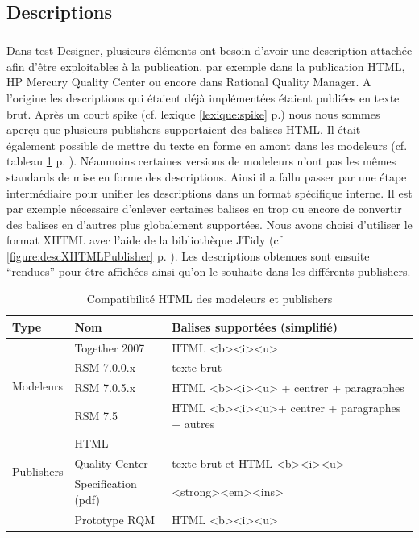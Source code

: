 \subsection{Descriptions}
\subparagraph*{}
Dans test Designer, plusieurs éléments ont besoin d'avoir une description attachée afin d'être exploitables à la publication, par exemple dans la publication HTML, HP Mercury Quality Center ou encore dans Rational Quality Manager. A l'origine les descriptions qui étaient déjà implémentées étaient publiées en texte brut. Après un court spike (cf. lexique \ref{lexique:spike} p.\pageref{lexique:spike}) nous nous sommes aperçu que plusieurs publishers supportaient des balises HTML. Il était également possible de mettre du texte en forme en amont dans les modeleurs (cf. tableau \ref{tableau:compatDescHTML} p. \pageref{tableau:compatDescHTML}). Néanmoins certaines versions de modeleurs n'ont pas les mêmes standards de mise en forme des descriptions. Ainsi il a fallu passer par une étape intermédiaire pour unifier les descriptions dans un format spécifique interne. Il est par exemple nécessaire d'enlever certaines balises en trop ou encore de convertir des balises en d'autres plus globalement supportées. Nous avons choisi d'utiliser le format XHTML avec l'aide de la bibliothèque JTidy (cf \ref{figure:descXHTMLPublisher} p. \pageref{figure:descXHTMLPublisher}). Les descriptions obtenues sont ensuite ``rendues'' pour être affichées ainsi qu'on le souhaite dans les différents publishers.
\begin{table}[!ht]
\caption{\label{tableau:compatDescHTML}Compatibilité HTML des modeleurs et publishers}
\begin{tabular}{|l|l|l|}
\hline
Type & Nom & Balises supportées (simplifié) \\
\hline
\hline
\multirow{4}{*}{Modeleurs} & Together 2007 & HTML <b><i><u> \\
& RSM 7.0.0.x & texte brut\\
& RSM 7.0.5.x & HTML <b><i><u> + centrer + paragraphes\\ 
& RSM 7.5 & HTML <b><i><u>+ centrer + paragraphes + autres\\ \hline
\multirow{3}{*}{Publishers} & HTML & \\
& Quality Center & texte brut et HTML <b><i><u> \\
& Specification (pdf) & <strong><em><ins> \\
& Prototype RQM & HTML <b><i><u> \\ \hline
\end{tabular}
\end{table}
